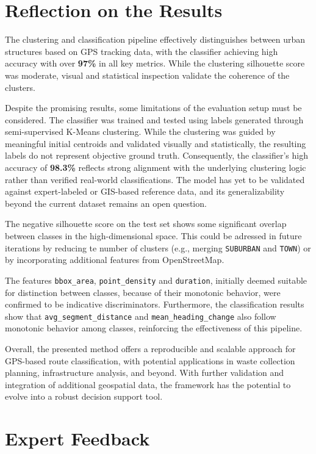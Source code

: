 \documentclass[a4paper,12pt,twoside]{scrreprt}
\begin{document}
\section{Reflection on the Results}

The clustering and classification pipeline effectively distinguishes between
urban structures based on GPS tracking data, with the classifier achieving high
accuracy with over \textbf{97\%} in all
key metrics. While the clustering silhouette score was moderate, visual and
statistical inspection validate the coherence of the clusters.

Despite the promising results, some limitations of the evaluation setup must be
considered. The classifier was trained and tested using labels generated
through semi-supervised K-Means clustering. While the clustering was guided by
meaningful initial centroids and validated visually and statistically, the
resulting labels do not represent objective ground truth. Consequently, the
classifier's high accuracy of \textbf{98.3\%} reflects strong alignment with
the underlying clustering logic rather than verified real-world
classifications. The model has yet to be validated against expert-labeled or
GIS-based reference data, and its generalizability beyond the current dataset
remains an open question.

The negative silhouette score on the test set shows some significant
overlap between classes in the high-dimensional space. This could
be adressed in future iterations by reducing te number of clusters (e.g.,
merging \texttt{SUBURBAN} and \texttt{TOWN}) or by incorporating additional
features from OpenStreetMap.

The features \texttt{bbox\_area}, \texttt{point\_density} and
\texttt{duration},
initially deemed suitable for distinction between classes, because of their
monotonic
behavior, were confirmed to be indicative discriminators.
Furthermore, the
classification results show that \texttt{avg\_segment\_distance} and
\texttt{mean\_heading\_change} also follow monotonic behavior among classes,
reinforcing the effectiveness of this pipeline.

Overall, the presented method offers a reproducible and scalable approach for
GPS-based
route classification, with potential applications in waste collection
planning, infrastructure analysis, and beyond. With further validation and
integration of additional geospatial data, the framework has the potential to
evolve into a robust decision support tool.

\section{Expert Feedback}
\end{document}
